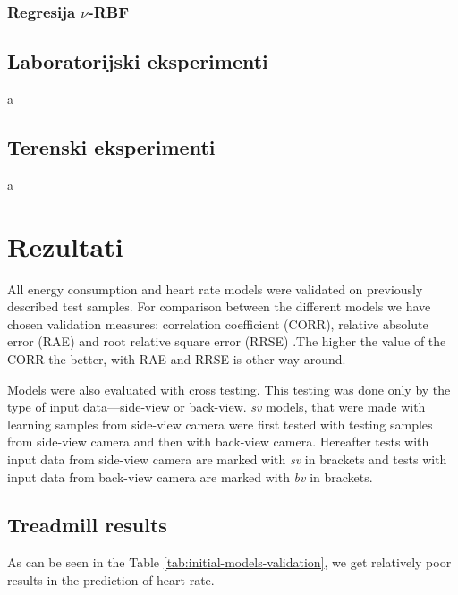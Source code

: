 \subsubsection{Regresija \texorpdfstring{$\nu$}{nu}-RBF}



\subsection{Laboratorijski eksperimenti}
a

\subsection{Terenski eksperimenti}
a

\section{Rezultati}
All energy consumption and heart rate models were validated on previously described test samples. For comparison between the different models we have chosen validation measures: correlation coefficient (CORR), relative absolute error (RAE) and root relative square error (RRSE) \cite{witten2005data}.The higher the value of the CORR the better, with RAE and RRSE is other way around.

Models were also evaluated with cross testing. This testing was done only by the type of input data---side-view or back-view. \textit{sv} models, that were made with learning samples from side-view camera were first tested with testing samples from side-view camera and then with back-view camera. Hereafter tests with input data from side-view camera are marked with \textit{sv} in brackets and tests with input data from back-view camera are marked with \textit{bv} in brackets.

\subsection{Treadmill results}\label{sec:initial-models}
As can be seen in the Table \ref{tab:initial-models-validation}, we get relatively poor results in the prediction of heart rate.

